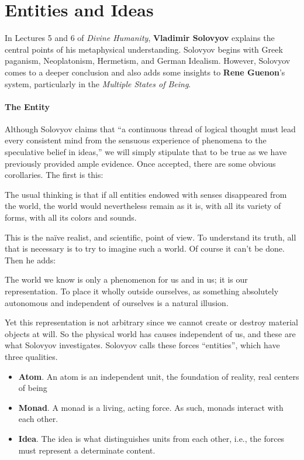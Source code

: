 \section{Entities and Ideas}

In Lectures 5 and 6 of \emph{Divine Humanity}, \textbf{Vladimir Solovyov} explains the central points of his metaphysical understanding. Solovyov begins with Greek paganism, Neoplatonism, Hermetism, and German Idealism. However, Solovyov comes to a deeper conclusion and also adds some insights to \textbf{Rene Guenon}'s system, particularly in the \emph{Multiple States of Being}.

\paragraph{The Entity}

Although Solovyov claims that ``a continuous thread of logical thought must lead every consistent mind from the sensuous experience of phenomena to the speculative belief in ideas,'' we will simply stipulate that to be true as we have previously provided ample evidence. Once accepted, there are some obvious corollaries. The first is this:

\begin{quotex}
The usual thinking is that if all entities endowed with senses disappeared from the world, the world would nevertheless remain as it is, with all its variety of forms, with all its colors and sounds.
\end{quotex}


This is the naïve realist, and scientific, point of view. To understand its truth, all that is necessary is to try to imagine such a world. Of course it can't be done. Then he adds:

\begin{quotex}
The world we know is only a phenomenon for us and in us; it is our representation. To place it wholly outside ourselves, as something absolutely autonomous and independent of ourselves is a natural illusion.
\end{quotex}


Yet this representation is not arbitrary since we cannot create or destroy material objects at will. So the physical world has causes independent of us, and these are what Solovyov investigates. Solovyov calls these forces ``entities'', which have three qualities.

\begin{itemize}


\item \textbf{Atom}. An atom is an independent unit, the foundation of reality, real centers of being

\item \textbf{Monad}. A monad is a living, acting force. As such, monads interact with each other.

\item \textbf{Idea}. The idea is what distinguishes units from each other, i.e., the forces must represent a determinate content.
\end{itemize}



